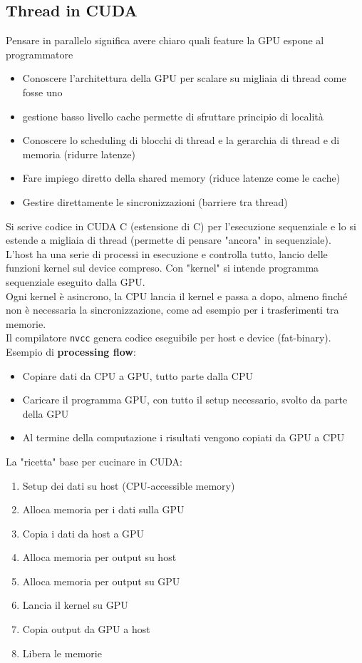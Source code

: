 \newpage

\subsection{Thread in CUDA}
Pensare in parallelo significa avere chiaro quali feature la GPU espone al programmatore
\begin{itemize}
	\item Conoscere l'architettura della GPU per scalare su migliaia di thread come fosse uno
	\item gestione basso livello cache permette di sfruttare principio di località
	\item Conoscere lo scheduling di blocchi di thread e la gerarchia di thread e di memoria (ridurre latenze)
	\item Fare impiego diretto della shared memory (riduce latenze come le cache)
	\item Gestire direttamente le sincronizzazioni (barriere tra thread)
\end{itemize}

Si scrive codice in CUDA C (estensione di C) per l'esecuzione sequenziale e lo si estende a migliaia di thread (permette di pensare "ancora" in sequenziale).\\

L'host ha una serie di processi in esecuzione e controlla tutto, lancio delle funzioni kernel sul device compreso. Con "kernel" si intende programma sequenziale eseguito dalla GPU.\\
Ogni kernel è asincrono, la CPU lancia il kernel e passa a dopo, almeno finché non è necessaria la sincronizzazione, come ad esempio per i trasferimenti tra memorie.\\

Il compilatore \texttt{nvcc} genera codice eseguibile per host e device (fat-binary).\\

Esempio di \textbf{processing flow}: 
\begin{itemize}
	\item Copiare dati da CPU a GPU, tutto parte dalla CPU
	\item Caricare il programma GPU, con tutto il setup necessario, svolto da parte della GPU
	\item Al termine della computazione i risultati vengono copiati da GPU a CPU
\end{itemize}

\newpage

La "ricetta" base per cucinare in CUDA:
\begin{enumerate}
	\item Setup dei dati su host (CPU-accessible memory)
	\item Alloca memoria per i dati sulla GPU
	\item Copia i dati da host a GPU
	\item Alloca memoria per output su host
	\item Alloca memoria per output su GPU
	\item Lancia il kernel su GPU
	\item Copia output da GPU a host
	\item Libera le memorie
\end{enumerate}

